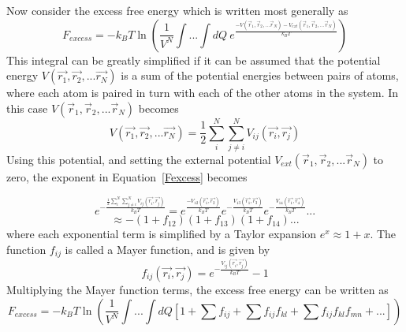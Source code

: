 \documentclass[double,12pt]{beavtex}
\begin{document}
Now consider the excess free energy which is written most generally as
\begin{equation}\label{Fexcess-mostgeneral}{F_{excess}= -k_BT\ln{\left(\frac{1}{V^N}\int{...}\int{dQ}~e^\frac{-V(\vec{r}_1, \vec{r}_2,...\vec{r}_N)-V_{ext}(\vec{r}_1, \vec{r}_2,...\vec{r}_N)}{k_BT}\right)}}\end{equation} 
This integral can be greatly simplified if it can be assumed that the potential energy $V(\vec{r_1},\vec{r_2},...\vec{r_N})$ is a sum of the potential energies between pairs of atoms, where each atom is paired in turn with each of the other atoms in the system. In this case $V(\vec{r}_1, \vec{r}_2,...\vec{r}_N)$ becomes 
\begin{equation}{V(\vec{r_1},\vec{r_2},...\vec{r_N})=\frac{1}{2}\sum^N_i\sum^N_{j\neq{i}}V_{ij}(\vec{r_i},\vec{r_j})}\end{equation} 
Using this potential, and setting the external potential $V_{ext}(\vec{r}_1, \vec{r}_2,...\vec{r}_N)$ to zero, the exponent in Equation~\ref{Fexcess} becomes

\begin{displaymath}{e^{-\frac{\frac{1}{2}\sum^N_i\sum^N_{j\neq{i}}V_{ij}(\vec{r_i},\vec{r_j})}{k_BT}}=e^{\frac{-V_{12}(\vec{r_1},\vec{r_2})}{k_BT}}e^{-\frac{V_{13}(\vec{r_1},\vec{r_3})}{k_BT}}e^{-\frac{V_{14}(\vec{r_1},\vec{r_4})}{k_BT}}...}\end{displaymath}    \begin{equation}{\approx-(1+f_{12})(1+f_{13})(1+f_{14})...}\end{equation}
where each exponential term is simplified by a Taylor expansion $e^x\approx{1+x}$. %
The function $f_{ij}$ is called a Mayer function, and is given by
\begin{equation}{f_{ij}(\vec{r_i},\vec{r_j})=e^{-\frac{V_{ij}(\vec{r_i},\vec{r_j})}{k_BT}}-1}\end{equation} 
Multiplying the Mayer function terms, the excess free energy can be written as
\begin{equation}\label{Fexcess-simplified}{F_{excess}=-k_BT\ln{\left(\frac{1}{V^N}\int{...}\int{dQ}\left[1 + \sum{f_{ij}} + \sum{f_{ij}f_{kl}} +\sum{f_{ij}f_{kl}f_{mn}} +... \right]\right)  }}\end{equation}
\end{document}
